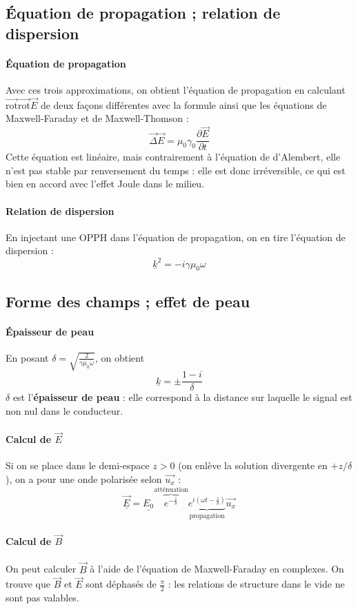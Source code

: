 \documentclass[french]{book}
\theoremstyle{plain}
\theoremstyle{definition}
\theoremstyle{remark}
\newcommand{\rot}{\overrightarrow{\text{rot}}}
\begin{document}
\subsection{Équation de propagation ; relation de dispersion}
\paragraph{Équation de propagation} Avec ces trois approximations, on obtient l'équation de propagation en calculant $\rot\rot\overrightarrow{E}$ de deux façons différentes avec la formule ainsi que les équations de Maxwell-Faraday et de Maxwell-Thomson : $$\overrightarrow{\Delta}\overrightarrow{E}=\mu_0\gamma_0\frac{\partial\overrightarrow{E}}{\partial t}$$ Cette équation est linéaire, mais contrairement à l'équation de d'Alembert, elle n'est pas stable par renversement du temps : elle est donc irréversible, ce qui est bien en accord avec l'effet Joule dans le milieu.
\paragraph{Relation de dispersion}En injectant une OPPH dans l'équation de propagation, on en tire l'équation de dispersion : $$\underline{k}^2=-i\gamma\mu_0\omega$$
\subsection{Forme des champs ; effet de peau}
\paragraph{Épaisseur de peau}En posant $\displaystyle\delta=\sqrt{\frac{2}{\gamma\mu_0\omega}}$, on obtient $$\displaystyle\underline{k}=\pm\frac{1-i}{\delta}$$$\delta$ est l'\textbf{épaisseur de peau} : elle correspond à la distance sur laquelle le signal est non nul dans le conducteur.
\paragraph{Calcul de $\overrightarrow{E}$}Si on se place dans le demi-espace $z>0$ (on enlève la solution divergente en $+z/\delta$), on a pour une onde polarisée selon $\overrightarrow{u_x}$ : $$\underline{\overrightarrow{E}}=\underline{E_0}\overset{\text{atténuation}}{\overbrace{e^{-\frac{z}{\delta}}}}\underset{\text{propagation}}{\underbrace{e^{i\left(\omega t-\frac{z}{\delta}\right)}}}\overrightarrow{u_x}$$
\paragraph{Calcul de $\overrightarrow{B}$} On peut calculer $\overrightarrow{B}$ à l'aide de l'équation de Maxwell-Faraday en complexes. On trouve que $\overrightarrow{B}$ et $\overrightarrow{E}$ sont déphasés de $\displaystyle\frac{\pi}{2}$ : les relations de structure dans le vide ne sont pas valables.
\end{document}
